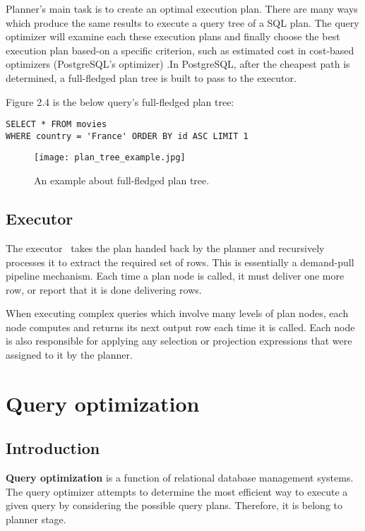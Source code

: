 Planner's main task is to create an optimal execution plan. There are many 
ways which produce the same results to execute a query tree of a SQL plan. The query optimizer will
examine each these execution plans and finally choose the best execution plan based-on 
a specific criterion, such as estimated cost in cost-based optimizers (PostgreSQL's optimizer)
.In PostgreSQL, after the cheapest path is determined, a full-fledged plan tree is built to pass to the executor.

Figure 2.4 is the below query's full-fledged plan tree:
\begin{verbatim}
SELECT * FROM movies
WHERE country = 'France' ORDER BY id ASC LIMIT 1
\end{verbatim}

\begin{figure}[H]
    \centering
    \texttt{[image: plan\_tree\_example.jpg]}
    \caption{An example about full-fledged plan tree.}
\end{figure}

\subsection{Executor}

The executor~\cite{pg_internals} takes the plan handed back by the planner and
recursively processes it to extract the required set of rows. This is
essentially a demand-pull pipeline mechanism. Each time a plan node is called,
it must deliver one more row, or report that it is done delivering rows.

When executing complex queries which involve many levels of plan nodes, each node computes and 
returns its next output row each time it is called. Each node is also responsible for applying 
any selection or projection expressions that were assigned to it by the planner.

\section{Query optimization}
\subsection{Introduction}

{\bfseries Query optimization} is a function of relational database management
systems. The query optimizer attempts to determine the most efficient way to
execute a given query by considering the possible query plans. Therefore, it is
belong to planner stage.


